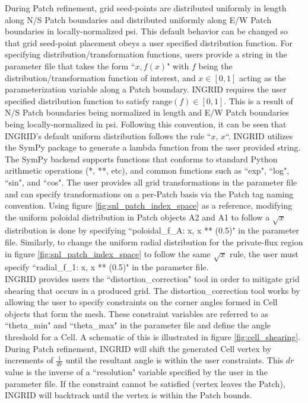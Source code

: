 During Patch refinement, grid seed-points are distributed uniformly in length along N/S Patch boundaries and distributed uniformly along E/W Patch boundaries in locally-normalized psi. This default behavior can be changed so that grid seed-point placement obeys a user specified distribution function. For specifying distribution/transformation functions, users provide a string in the parameter file that takes the form ``$x, f(x)$" with $f$ being the distribution/transformation function of interest, and $x \in [0, 1]$ acting as the parameterization variable along a Patch boundary. INGRID requires the user specified distribution function to satisfy $\text{range}(f) \in [0, 1]$. This is a result of N/S Patch boundaries being normalized in length and E/W Patch boundaries being locally-normalized in psi. Following this convention, it can be seen that INGRID's default uniform distribution follows the rule ``$x,\,x$``. INGRID utilizes the SymPy\cite{10.7717/peerj-cs.103} package to generate a lambda function from the user provided string.
The SymPy backend supports functions that conforms to standard Python arithmetic operations (*, **, etc), and common functions such as ``exp", ``log", ``sin", and ``cos". The user provides all grid transformations in the parameter file and can specify transformations on a per-Patch basis via the Patch tag naming convention. Using figure \ref{fig:snl_patch_index_space} as a reference, modifying the uniform poloidal distribution in Patch objects A2 and A1 to follow a $\sqrt{x}$ distribution is done by specifying ``poloidal\_f\_A: x, x ** (0.5)" in the parameter file. Similarly, to change the uniform radial distribution for the private-flux region in figure \ref{fig:snl_patch_index_space} to follow the same $\sqrt{x}$ rule, the user must specify ``radial\_f\_1: x, x ** (0.5)" in the parameter file.\\ \indent
INGRID provides users the ``distortion\_correction" tool in order to mitigate grid shearing that occurs in a produced grid. The distortion\_correction tool works by allowing the user to specify constraints on the corner angles formed in Cell objects that form the mesh. These constraint variables are referred to as ``theta\_min" and ``theta\_max" in the parameter file and define the angle threshold for a Cell. A schematic of this is illustrated in figure \ref{fig:cell_shearing}. During Patch refinement, INGRID will shift the generated Cell vertex by increments of $\frac{1}{dr}$ until the resultant angle is within the user constraints. This $dr$ value is the inverse of a ``resolution" variable specified by the user in the parameter file. If the constraint cannot be satisfied (vertex leaves the Patch), INGRID will backtrack until the vertex is within the Patch bounds.